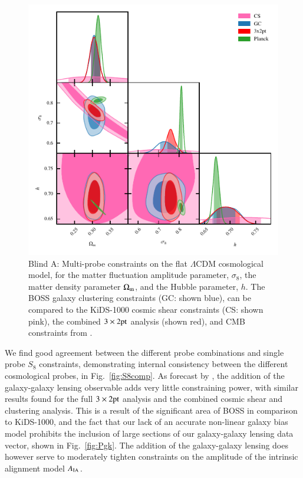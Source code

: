\begin{figure}
	\begin{center}
		\includegraphics[width=\columnwidth]{Parameter_Plots/cosmology/omegam_sigma8_h_blind_C}
		\caption{Blind A: Multi-probe constraints on the flat $\Lambda$CDM cosmological model, for the matter fluctuation amplitude parameter, $\sigma_8$, the matter density parameter $\Omega_{\rm m}$, and the Hubble parameter, $h$.  The BOSS galaxy clustering constraints (GC: shown blue), can be compared to the KiDS-1000 cosmic shear constraints (CS: shown pink), the combined $3\times2{\rm pt}$ analysis (shown red), and CMB constraints from \citet{planck/etal:2018}.}
		\label{fig:cosmology-params}
	\end{center}
\end{figure}

We find good agreement between the different probe combinations and single probe $S_8$ constraints, demonstrating internal consistency between the different cosmological probes, in Fig.~\ref{fig:S8comp}.  As forecast by \citet{joachimi/etal:inprep}, the addition of the galaxy-galaxy lensing observable adds very little constraining power, with similar results found for the full $3\times2{\rm pt}$ analysis and the combined cosmic shear and clustering analysis.   This is a result of the significant area of BOSS in comparison to KiDS-1000, and the fact that our lack of an accurate non-linear galaxy bias model prohibits the inclusion of large sections of our galaxy-galaxy lensing data vector, shown in Fig.~\ref{fig:Pgk}.     The addition of the galaxy-galaxy lensing does however serve to moderately tighten constraints on the amplitude of the intrinsic alignment model $A_{\rm IA}$. 

